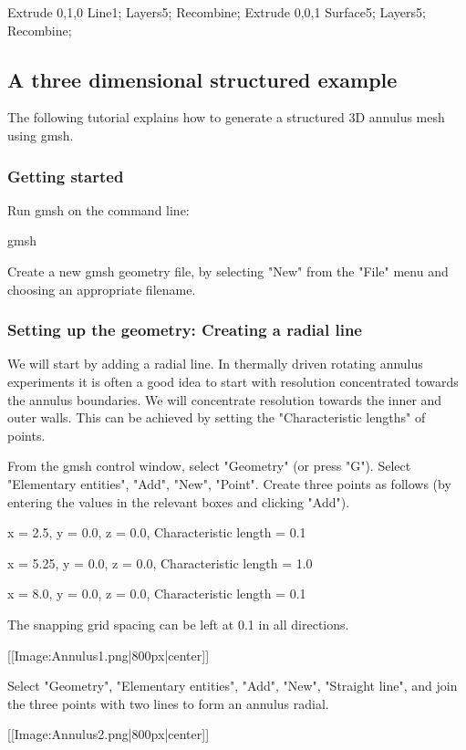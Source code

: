  Extrude {0,1,0} {
   Line{1}; Layers{5}; Recombine;
 }
 Extrude {0,0,1} {
   Surface{5}; Layers{5}; Recombine;
 }

\subsection{A three dimensional structured example}

The following tutorial explains how to generate a structured 3D annulus mesh using gmsh.

\subsubsection{Getting started}

Run gmsh on the command line:

  gmsh

Create a new gmsh geometry file, by selecting "New" from the "File" menu and choosing an appropriate filename.

\subsubsection{Setting up the geometry: Creating a radial line}

We will start by adding a radial line. In thermally driven rotating annulus experiments it is often a good idea to start with resolution concentrated towards the annulus boundaries. We will concentrate resolution towards the inner and outer walls. This can be achieved by setting the "Characteristic lengths" of points.

From the gmsh control window, select "Geometry" (or press "G"). Select "Elementary entities", "Add", "New", "Point". Create three points as follows (by entering the values in the relevant boxes and clicking "Add").


x = 2.5, y = 0.0, z = 0.0, Characteristic length = 0.1

x = 5.25, y = 0.0, z = 0.0, Characteristic length = 1.0

x = 8.0, y = 0.0, z = 0.0, Characteristic length = 0.1


The snapping grid spacing can be left at 0.1 in all directions.


[[Image:Annulus1.png|800px|center]]


Select "Geometry", "Elementary entities", "Add", "New", "Straight line", and join the three points with two lines to form an annulus radial.


[[Image:Annulus2.png|800px|center]]

